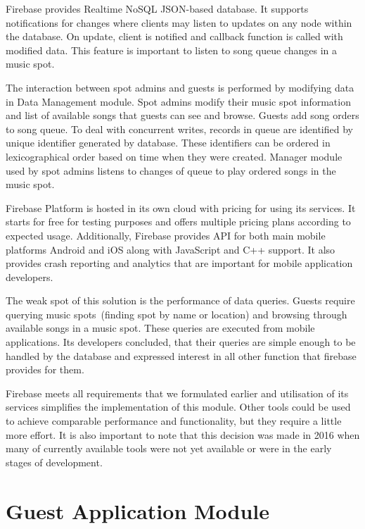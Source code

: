 \par
Firebase provides Realtime NoSQL JSON-based database. It supports notifications for changes where clients may listen to updates on any node within the database. On update, client is notified and callback function is called with modified data. This feature is important to listen to song queue changes in a music spot.
\par
The interaction between spot admins and guests is performed by modifying data in Data Management module. Spot admins modify their music spot information and list of available songs that guests can see and browse. Guests add song orders to song queue. To deal with concurrent writes, records in queue are identified by unique identifier generated by database. These identifiers can be ordered in lexicographical order based on time when they were created. Manager module used by spot admins listens to changes of queue to play ordered songs in the music spot. 
\par
Firebase Platform is hosted in its own cloud with pricing for using its services. It starts for free for testing purposes and offers multiple pricing plans according to expected usage. Additionally, Firebase provides API for both main mobile platforms Android and iOS along with JavaScript and C++ support. It also provides crash reporting and analytics that are important for mobile application developers.
\par
The weak spot of this solution is the performance of data queries. Guests require querying music spots~(finding spot by name or location) and browsing through available songs in a music spot. These queries are executed from mobile applications. Its developers concluded, that their queries are simple enough to be handled by the database and expressed interest in all other function that firebase provides for them.
\par
Firebase meets all requirements that we formulated earlier and utilisation of its services simplifies the implementation of this module. Other tools could be used to achieve comparable performance and functionality, but they require a little more effort. It is also important to note that this decision was made in 2016 when many of currently available tools were not yet available or were in the early stages of development.

\section{Guest Application Module}


